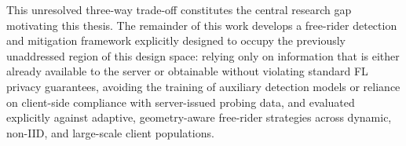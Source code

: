 This unresolved three-way trade-off constitutes the central research gap motivating this thesis. The remainder of this work develops a free-rider detection and mitigation framework explicitly designed to occupy the previously unaddressed region of this design space: relying only on information that is either already available to the server or obtainable without violating standard FL privacy guarantees, avoiding the training of auxiliary detection models or reliance on client-side compliance with server-issued probing data, and evaluated explicitly against adaptive, geometry-aware free-rider strategies across dynamic, non-IID, and large-scale client populations.
